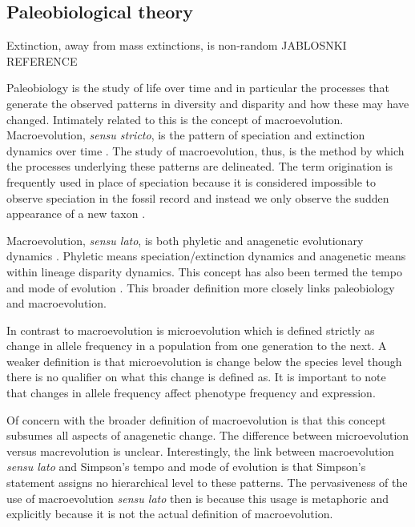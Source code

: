 \documentclass[12pt,letterpaper]{article}
\begin{document}
\subsection{Paleobiological theory}

Extinction, away from mass extinctions, is non-random JABLOSNKI REFERENCE

Paleobiology is the study of life over time and in particular the processes that generate the observed patterns in diversity and disparity and how these may have changed.  %
Intimately related to this is the concept of macroevolution. Macroevolution, \textit{sensu stricto}, is the pattern of speciation and extinction dynamics over time \citep{Jablonski2008a}. The study of macroevolution, thus, is the method by which the processes underlying these patterns are delineated. The term origination is frequently used in place of speciation because it is considered impossible to observe speciation in the fossil record and instead we only observe the sudden appearance of a new taxon \citep{Coyne2004}.

Macroevolution, \textit{sensu lato}, is both phyletic and anagenetic evolutionary dynamics \citep{Foote2007b}. Phyletic means speciation/extinction dynamics and anagenetic means within lineage disparity dynamics. This concept has also been termed the tempo and mode of evolution \citep{Simpson1944}. This broader definition more closely links paleobiology and macroevolution.

In contrast to macroevolution is microevolution \citep{Simpson1944,Foote2007b} which is defined strictly as change in allele frequency in a population from one generation to the next. A weaker definition is that microevolution is change below the species level \citep{Foote2007b} though there is no qualifier on what this change is defined as. It is important to note that changes in allele frequency affect phenotype frequency and expression.


Of concern with the broader definition of macroevolution is that this concept subsumes all aspects of anagenetic change. The difference between microevolution versus macrevolution is unclear. Interestingly, the link between macroevolution \textit{sensu lato} and Simpson's tempo and mode of evolution is that Simpson's statement assigns no hierarchical level to these patterns. The pervasiveness of the use of macroevolution \textit{sensu lato} then is because this usage is metaphoric and explicitly because it is not the actual definition of macroevolution.
\end{document}

